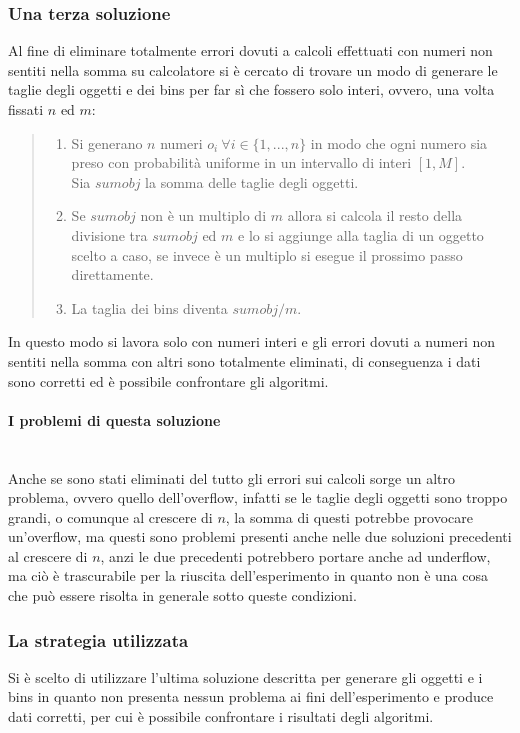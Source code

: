 \subsubsection{Una terza soluzione}
Al fine di eliminare totalmente errori dovuti a calcoli effettuati con numeri non sentiti nella somma su calcolatore 
si è cercato di trovare un modo di generare le taglie degli oggetti e dei bins per far sì che fossero solo interi, ovvero, una volta fissati 
$ n $ ed $ m $:
\begin{quote}
	\begin{enumerate}
		\item Si generano $ n $ numeri $ o_i \: \forall i \in \{1, ..., n\} $ in modo che ogni numero sia preso con probabilità
			  uniforme in un intervallo di interi $ [1, M] $.\\
			  Sia $ sumobj $ la somma delle taglie degli oggetti.
		\item Se $ sumobj $  non è un multiplo di $ m $ allora si calcola il resto 
			  della divisione tra $ sumobj $ ed $ m $ e lo si aggiunge alla taglia di un oggetto scelto a caso, se invece è un multiplo 
			  si esegue il prossimo passo direttamente.
		\item La taglia dei bins diventa $ sumobj/m $.
	\end{enumerate}
\end{quote}
In questo modo si lavora solo con numeri interi e gli errori dovuti a numeri non sentiti nella somma con altri sono totalmente
eliminati, di conseguenza i dati sono corretti ed è possibile confrontare gli algoritmi.

\paragraph{I problemi di questa soluzione}\mbox{}\\
Anche se sono stati eliminati del tutto gli errori sui calcoli sorge un altro problema, ovvero quello dell'overflow, infatti se le taglie
degli oggetti sono troppo grandi, o comunque al crescere di $ n $, la somma di questi potrebbe provocare un'overflow, ma questi sono problemi
presenti anche nelle due soluzioni precedenti al crescere di $ n $, anzi le due precedenti potrebbero portare anche ad underflow, ma ciò è trascurabile per
la riuscita dell'esperimento in quanto non è una cosa che può essere risolta in generale sotto queste condizioni.


\subsubsection{La strategia utilizzata}
Si è scelto di utilizzare l'ultima soluzione descritta per generare gli oggetti e i bins in quanto non presenta nessun problema ai fini
dell'esperimento e produce dati corretti, per cui è possibile confrontare i risultati degli algoritmi.


